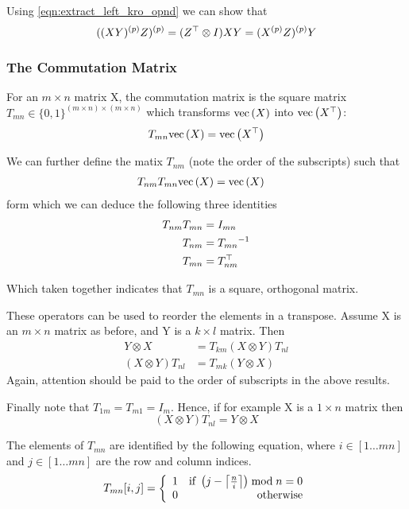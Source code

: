 Using \eqref{eqn:extract_left_kro_opnd} we can show that
\begin{equation}
{ ( { (XY)^{(p)} } Z)^{(p)} } = (Z^\top \otimes I)XY = { ({ X^{(p)} }Z)^{(p)} }Y
\end{equation}

\subsubsection{The Commutation Matrix}
For an $m \times n$ matrix X, the commutation matrix\cite{Magnus1988} is the square matrix $T_{mn} \in \{0,1\}^{(m \times n) \times (m \times n)}$ which transforms $\text{vec}\left(X\right)$ into $\text{vec}\left(X^\top\right)$:
\begin{equation}
T_{mn} \text{vec}\left(X\right) = \text{vec}\left(X^\top\right)
\end{equation}

We can further define the matix $T_{nm}$ (note the order of the subscripts) such that
\begin{align}
T_{nm} T_{mn} \text{vec}\left(X\right)  & = \text{vec}\left(X\right) 
\end{align}
form which we can deduce the following three identities
\begin{align}
T_{nm} T_{mn}           &= I_{mn} \\
T_{nm}                  &= {T_{mn}}^{-1} \\
T_{mn}                  &= T_{nm}^\top \label{eqn:transform_transpose}
\end{align}

Which taken together indicates that $T_{mn}$ is a square, orthogonal matrix. 

These operators can be used to reorder the elements in a transpose. Assume X is an $m \times n$ matrix as before, and Y is a $k \times l$ matrix. Then
\begin{align}
Y \otimes X & = T_{km} (X \otimes Y) T_{nl} \label{eqn:kro_reorder} \\
(X \otimes Y)T_{nl} & = T_{mk} (Y \otimes X)
\end{align}
Again, attention should be paid to the order of subscripts in the above results.

Finally note that $T_{1m} = T_{m1} = I_m$. Hence, if for example X is a $1 \times n$ matrix then
\begin{equation}
(X \otimes Y)T_{nl} = Y \otimes X
\end{equation}

The elements of $T_{mn}$ are identified by the following equation, where $i \in [1\ldots mn]$ and $j \in [1 \ldots mn]$ are the row and column indices.
\begin{equation}
T_{mn}[i,j] = 
\left\{
    \begin{array}{lr}
    1 & \text{if }  \left(j - \left \lceil \frac{n}{i} \right \rceil\right) \bmod n = 0 \\
    0 & \text{otherwise}
    \end{array}
\right.
\end{equation}


